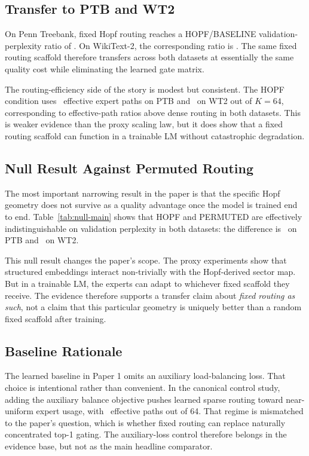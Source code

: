 \documentclass[10pt,twocolumn]{article}
\begin{document}
\subsection{Transfer to PTB and WT2}
On Penn Treebank, fixed Hopf routing reaches a HOPF/BASELINE validation-perplexity ratio of \PaperPTBHopfBaselineRatio. On WikiText-2, the corresponding ratio is \PaperWTTwoHopfBaselineRatio. The same fixed routing scaffold therefore transfers across both datasets at essentially the same quality cost while eliminating the learned gate matrix.

The routing-efficiency side of the story is modest but consistent. The HOPF condition uses \PaperPTBHopfEff\ effective expert paths on PTB and \PaperWTTwoHopfEff\ on WT2 out of $K=64$, corresponding to effective-path ratios above dense routing in both datasets. This is weaker evidence than the proxy scaling law, but it does show that a fixed routing scaffold can function in a trainable LM without catastrophic degradation.

\subsection{Null Result Against Permuted Routing}
\label{sec:null}
The most important narrowing result in the paper is that the specific Hopf geometry does not survive as a quality advantage once the model is trained end to end. Table~\ref{tab:null-main} shows that HOPF and PERMUTED are effectively indistinguishable on validation perplexity in both datasets: the difference is \PaperPTBHopfPermDelta\ on PTB and \PaperWTTwoHopfPermDelta\ on WT2.

\begin{table}[t]
  \centering
  \caption{Key null result. In the trainable LM, HOPF is not distinguishable from randomly permuted fixed routing on quality.}
  \label{tab:null-main}
  \small
  \resizebox{\columnwidth}{!}{}
\end{table}

This null result changes the paper's scope. The proxy experiments show that structured embeddings interact non-trivially with the Hopf-derived sector map. But in a trainable LM, the experts can adapt to whichever fixed scaffold they receive. The evidence therefore supports a transfer claim about \emph{fixed routing as such}, not a claim that this particular geometry is uniquely better than a random fixed scaffold after training.

\subsection{Baseline Rationale}
The learned baseline in Paper 1 omits an auxiliary load-balancing loss. That choice is intentional rather than convenient. In the canonical control study, adding the auxiliary balance objective pushes learned sparse routing toward near-uniform expert usage, with \PaperAuxSparseEff\ effective paths out of 64. That regime is mismatched to the paper's question, which is whether fixed routing can replace naturally concentrated top-1 gating. The auxiliary-loss control therefore belongs in the evidence base, but not as the main headline comparator.
\end{document}
